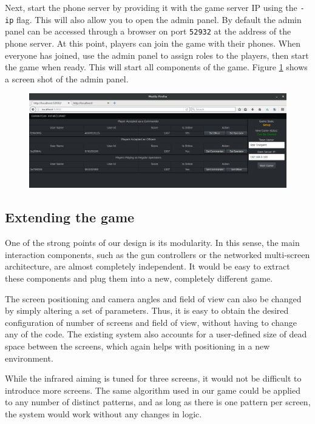\documentclass[a4paper,11pt]{article}
\begin{document}
Next, start the phone server by providing it with the game server IP using the \texttt{-ip} flag. This will also allow you to open the admin panel. By default the admin panel can be accessed through a browser on port \texttt{52932} at the address of the phone server. At this point, players can join the game with their phones. When everyone has joined, use the admin panel to assign roles to the players, then start the game when ready. This will start all components of the game. Figure \ref{fig:admin_panel} shows a screen shot of the admin panel.

\begin{figure}[ht]
	\centering
	\includegraphics[width=\textwidth]{images/admin_panel}
    \label{fig:admin_panel}
\end{figure}

\subsection{Extending the game}
One of the strong points of our design is its modularity. In this sense, the main interaction components, such as the gun controllers or the networked multi-screen architecture, are almost completely independent. It would be easy to extract these components and plug them into a new, completely different game.

The screen positioning and camera angles and field of view can also be changed by simply altering a set of parameters. Thus, it is easy to obtain the desired configuration of number of screens and field of view, without having to change any of the code. The existing system also accounts for a user-defined size of dead space between the screens, which again helps with positioning in a new environment.

While the infrared aiming is tuned for three screens, it would not be difficult to introduce more screens. The same algorithm used in our game could be applied to any number of distinct patterns, and as long as there is one pattern per screen, the system would work without any changes in logic.
\end{document}
